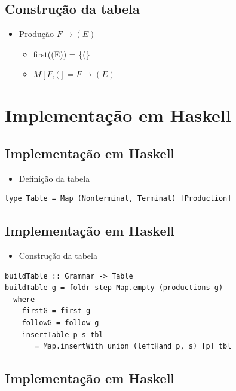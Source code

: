 \documentclass[11pt]{article}
\begin{document}
\subsection*{Construção da tabela}
\label{sec:orgbeefd52}

\begin{itemize}
\item Produção \(F \to (E)\)
\begin{itemize}
\item first((E)) = \{(\}
\item \(M[F,(] = F \to (E)\)
\end{itemize}
\end{itemize}
\section*{Implementação em Haskell}
\label{sec:org150d160}

\subsection*{Implementação em Haskell}
\label{sec:org9ba53c8}

\begin{itemize}
\item Definição da tabela
\end{itemize}

\begin{verbatim}
type Table = Map (Nonterminal, Terminal) [Production]
\end{verbatim}
\subsection*{Implementação em Haskell}
\label{sec:org768f747}

\begin{itemize}
\item Construção da tabela
\end{itemize}

\begin{verbatim}
buildTable :: Grammar -> Table
buildTable g = foldr step Map.empty (productions g)
  where
    firstG = first g
    followG = follow g
    insertTable p s tbl
       = Map.insertWith union (leftHand p, s) [p] tbl 
\end{verbatim}
\subsection*{Implementação em Haskell}
\label{sec:org484719b}
\end{document}
